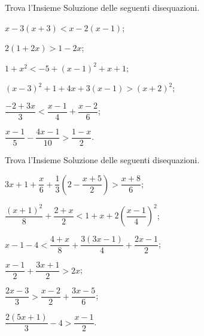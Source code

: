 \begin{esercizio}[\Ast]
 \label{ese:18.15}
Trova l'Insieme Soluzione delle seguenti disequazioni.
 \begin{multicols}{2}
 \begin{enumeratea}
\item $x-3(x+3)<x-2(x-1)$;
\item $2(1+2x)>1-2x$;
\item $1+x^{2}<-5+(x-1)^{2}+x+1$;
\item $(x-3)^{2}+1+4x+3(x-1)>(x+2)^{2}$;
\item $\dfrac{-2+3x}{3}<\dfrac{x-1}{4}+\dfrac{x-2}{6}$;
\item $\dfrac{x-1}{5}-\dfrac{4x-1}{10}>\dfrac{1-x}{2}$.
\end{enumeratea}
\end{multicols}
\end{esercizio}

\begin{esercizio}[\Ast]
 \label{ese:18.16}
Trova l'Insieme Soluzione delle seguenti disequazioni.
 \begin{multicols}{2}
 \begin{enumeratea}
\item $3x+1+\dfrac{x}{6}+\dfrac{1}{3}\left(2-\dfrac{x+5}{2}\right)>\dfrac{x+8}{6}$;
\item $\dfrac{(x+1)^{2}}{8}+\dfrac{2+x}{2}<1+x+2\left(\dfrac{x-1}{4}\right)^{2}$;
\item $x-1-4<\dfrac{4+x}{8}+\dfrac{3(3x-1)}{4}+\dfrac{2x-1}{2}$;
\item $\dfrac{x-1}{2}+\dfrac{3x+1}{2}>2x$;
\item $\dfrac{2x-3}{3}>\dfrac{x-2}{2}+\dfrac{3x-5}{6}$;
\item $\dfrac{2(5x+1)}{3}-4>\dfrac{x-1}{2}$.
\end{enumeratea}
\end{multicols}
\end{esercizio}


